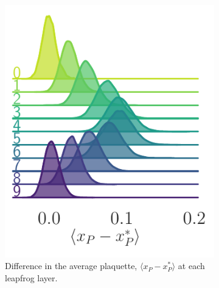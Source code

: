 \documentclass{article} %
\begin{document}
\begin{figure}[hbpt]
   \begin{subfigure}[t]{0.33\textwidth}
      \includegraphics[width=\textwidth]{figures/ridgeplots/plaqsf.pdf}
      \caption{\label{fig:plaqsf}Difference in the average plaquette, \(\langle x_{P}-x_{P}^{*}\rangle\) at each
      leapfrog layer.}
   \end{subfigure}
   \hfill
   \begin{subfigure}[t]{0.315\textwidth}

\end{subfigure}
\end{figure}
\end{document}
